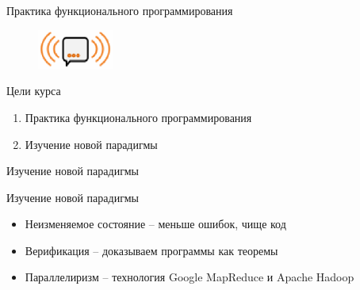 \documentclass{beamer}
\begin{document}
\begin{frame}{Практика функционального программирования}
\begin{figure}[h]
\begin{minipage}[h]{0.49\linewidth}
\begin{center}
      \end{center}
    \end{minipage}
    \begin{minipage}[h]{0.49\linewidth}
      \begin{center}
        \includegraphics[height=13mm]{lecture0/Socialabs.eps}
      \end{center}
    \end{minipage}
  \end{figure}
\end{frame}

\begin{frame}{Цели курса}
  \begin{enumerate}
  \item Практика функционального программирования
  \item Изучение новой парадигмы
  \end{enumerate}
\end{frame}

\begin{frame}[fragile]{Изучение новой парадигмы}  
  \begin{minipage}[t]{0.49\linewidth}
    \begin{center}
            
    \end{center}
  \end{minipage}
  \begin{minipage}[t]{0.49\linewidth}
    \begin{center}
      
    \end{center}
  \end{minipage}
\end{frame}

\begin{frame}{Изучение новой парадигмы}
  \begin{itemize}
  \item Неизменяемое состояние -- меньше ошибок, чище код\pause
  \item Верификация -- доказываем программы как теоремы\pause
  \item Параллелиризм -- технология Google MapReduce и Apache Hadoop
  \end{itemize}
\end{frame}
\end{document}
